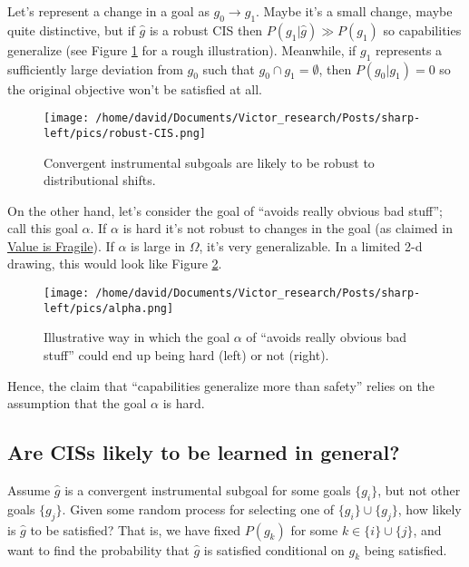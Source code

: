 \documentclass{article}
\begin{document}
Let's represent a change in a goal as $g_0 \rightarrow g_1$. Maybe it's a small change, maybe quite distinctive, but if $\hat{g}$ is a robust CIS then $P(g_1|\hat{g})\gg P(g_1)$ so capabilities generalize (see Figure \ref{fig:robust-CIS} for a rough illustration). Meanwhile, if $g_1$ represents a sufficiently large deviation from $g_0$ such that $g_0 \cap g_1 = \emptyset$, then $P(g_0|g_1)=0$ so the original objective won't be satisfied at all.

\begin{figure}[ht]
    \centering
    \texttt{[image: /home/david/Documents/Victor\_research/Posts/sharp-left/pics/robust-CIS.png]} 
    \caption{Convergent instrumental subgoals are likely to be robust to distributional shifts.}
    \label{fig:robust-CIS} 
\end{figure}

On the other hand, let's consider the goal of ``avoids really obvious bad stuff''; call this goal $\alpha$. If $\alpha$ is hard it's not robust to changes in the goal (as claimed in \href{https://www.lesswrong.com/posts/GNnHHmm8EzePmKzPk/value-is-fragile}{Value is Fragile}). If $\alpha$ is large in $\Omega$, it's very generalizable. In a limited 2-d drawing, this would look like Figure \ref{fig:alpha}.

\begin{figure}[ht]
    \centering
    \texttt{[image: /home/david/Documents/Victor\_research/Posts/sharp-left/pics/alpha.png]} 
    \caption{Illustrative way in which the goal $\alpha$ of ``avoids really obvious bad stuff'' could end up being hard (left) or not (right).}
    \label{fig:alpha} 
\end{figure}

Hence, the claim that ``capabilities generalize more than safety'' relies on the assumption that the goal $\alpha$ is hard.

\subsection{Are CISs likely to be learned in general?}\label{CIS-general}
Assume $\hat{g}$ is a convergent instrumental subgoal for some goals $\{g_i\}$, but not other goals $\{g_j\}$. Given some random process for selecting one of $\{g_i\} \cup \{g_j\}$, how likely is $\hat{g}$ to be satisfied? That is, we have fixed $P(g_k)$ for some $k \in \{i\} \cup \{j\}$, and want to find the probability that $\hat{g}$ is satisfied conditional on $g_k$ being satisfied.
\end{document}
